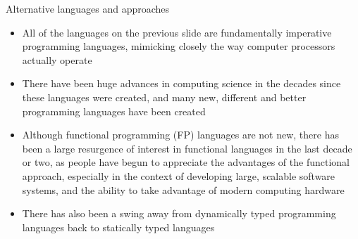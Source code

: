 \documentclass[mathserif,handout]{beamer}
\begin{document}
\begin{frame}{Alternative languages and approaches}
\protect\hypertarget{alternative-languages-and-approaches}{}

\begin{itemize}

\item
  All of the languages on the previous slide are fundamentally
  \alert{imperative} programming languages, mimicking closely the way
  computer processors actually operate
\item
  There have been huge advances in computing science in the decades
  since these languages were created, and many new, different and better
  programming languages have been created
\item
  Although \alert{functional} programming (FP) languages are not new,
  there has been a large resurgence of interest in functional languages
  in the last decade or two, as people have begun to appreciate the
  advantages of the functional approach, especially in the context of
  developing large, scalable software systems, and the ability to take
  advantage of modern computing hardware
\item
  There has also been a swing away from \alert{dynamically typed}
  programming languages back to \alert{statically typed} languages
\end{itemize}

\end{frame}

\end{document}
